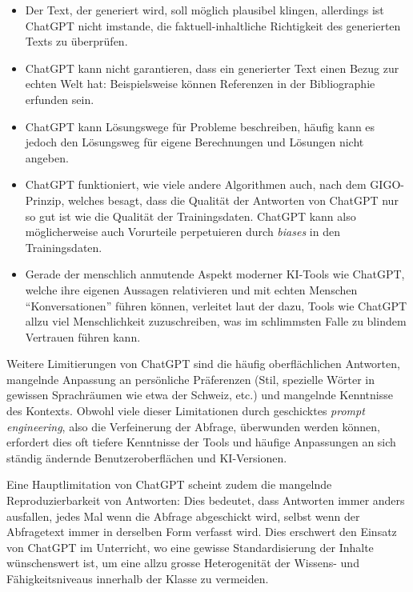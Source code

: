 \begin{itemize}
\item Der Text, der generiert wird, soll möglich plausibel klingen, allerdings ist ChatGPT nicht imstande, die faktuell-inhaltliche Richtigkeit des generierten Texts zu überprüfen.
\item ChatGPT kann nicht garantieren, dass ein generierter Text einen Bezug zur echten Welt hat: Beispielsweise können Referenzen in der Bibliographie erfunden sein.
\item ChatGPT kann Lösungswege für Probleme beschreiben, häufig kann es jedoch den Lösungsweg für eigene Berechnungen und Lösungen nicht angeben.
\item ChatGPT funktioniert, wie viele andere Algorithmen auch, nach dem \gls{GIGO}-Prinzip, welches besagt, dass die Qualität der Antworten von ChatGPT nur so gut ist wie die Qualität der Trainingsdaten. ChatGPT kann also möglicherweise auch Vorurteile perpetuieren durch \textit{biases} in den Trainingsdaten.
\item Gerade der menschlich anmutende Aspekt moderner \gls{KI}-Tools wie ChatGPT, welche ihre eigenen Aussagen relativieren und mit echten Menschen ``Konversationen'' führen können, verleitet laut der \textcite{bfh} dazu, Tools wie ChatGPT allzu viel Menschlichkeit zuzuschreiben, was im schlimmsten Falle zu blindem Vertrauen führen kann. 
\end{itemize}

Weitere Limitierungen von ChatGPT sind die häufig oberflächlichen Antworten, mangelnde Anpassung an persönliche Präferenzen (Stil, spezielle Wörter in gewissen Sprachräumen wie etwa der Schweiz, etc.) und mangelnde Kenntnisse des Kontexts. Obwohl viele dieser Limitationen durch geschicktes \textit{prompt engineering}, also die Verfeinerung der Abfrage, überwunden werden können, erfordert dies oft tiefere Kenntnisse der Tools und häufige Anpassungen an sich ständig ändernde Benutzeroberflächen und \gls{KI}-Versionen. 

Eine Hauptlimitation von ChatGPT scheint zudem die mangelnde Reproduzierbarkeit von Antworten: Dies bedeutet, dass Antworten immer anders ausfallen, jedes Mal wenn die Abfrage abgeschickt wird, selbst wenn der Abfragetext immer in derselben Form verfasst wird. Dies erschwert den Einsatz von ChatGPT im Unterricht, wo eine gewisse Standardisierung der Inhalte wünschenswert ist, um eine allzu grosse Heterogenität der Wissens- und Fähigkeitsniveaus innerhalb der Klasse zu vermeiden.

